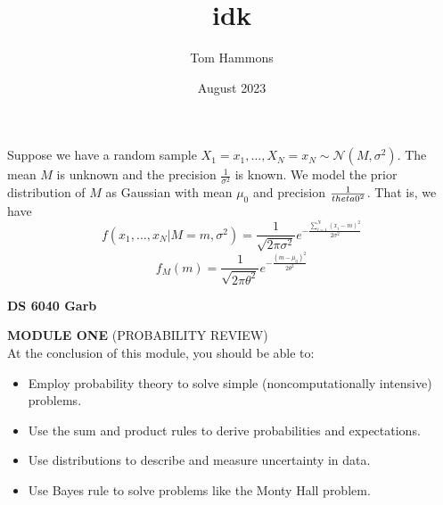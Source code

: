 \documentclass{article}
\title{idk}
\author{Tom Hammons}
\date{August 2023}
\begin{document}
Suppose we have a random sample $X_1=x_1, \ldots, X_N=x_N \sim \mathcal{N}\left(M, \sigma^{2}\right)$. The mean $M$ is unknown and the precision $\frac{1}{\sigma^2}$ is known. We model the prior distribution of $M$ as Gaussian with mean $\mu_0$ and precision $\frac{1}{\\theta{0}^{2}}$. That is, we have
$$ f\left(x_1, \ldots, x_N | M=m, \sigma^{2}\right) = \frac{1}{\sqrt{2\pi\sigma^{2}}}e^{-\frac{\sum\limits_{i=1}^{N}\left(x_i - m\right)^{2}}{2\sigma^{2}}}$$
$$ f_{M}\left(m\right) = \frac{1}{\sqrt{2\pi\theta^{2}}} e^{-\frac{\left(m-\mu_{0}\right)^{2}}{2\theta^{2}}}$$

\begin{center}
    {\Large \textbf{DS 6040 Garb}}
\end{center}

\noindent \textbf{MODULE ONE} (PROBABILITY REVIEW) \\
At the conclusion of this module, you should be able to:
\begin{itemize}
    \item Employ probability theory to solve simple (noncomputationally intensive) problems.
    \item Use the sum and product rules to derive probabilities and expectations.
    \item Use distributions to describe and measure uncertainty in data.
    \item Use Bayes rule to solve problems like the Monty Hall problem.
\end{itemize}
\end{document}
